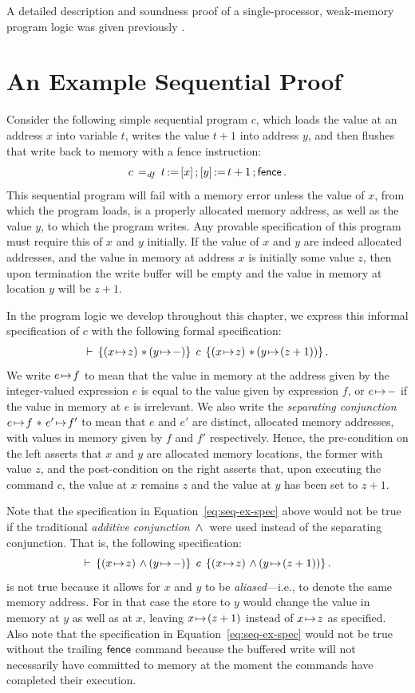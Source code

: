 \documentclass[11pt]{report}         %
\begin{document}
A detailed description and soundness proof of a single-processor, weak-memory program logic was given previously \cite{wmsldetails}. 

\section{An Example Sequential Proof}
\label{sec:ex-seq-proof}

Consider the following simple sequential program $c$, which loads the value at an address $x$ into variable $t$, writes the value $t+1$ into address $y$, and then flushes that write back to memory with a fence instruction: \[ c \operatorname{\;=_{\mathit{df}}\;} t \operatorname{:\!=} \left[ x \right] \operatorname{;} \left[ y \right] \operatorname{:\!=} t+1 \operatorname{;} \operatorname{\mathsf{fence}}.\] This sequential program will fail with a memory error unless the value of $x$, from which the program loads, is a properly allocated memory address, as well as the value $y$, to which the program writes. Any provable specification of this program must require this of $x$ and $y$ initially. If the value of $x$ and $y$ are indeed allocated addresses, and the value in memory at address $x$ is initially some value $z$, then upon termination the write buffer will be empty and the value in memory at location $y$ will be $z+1$. 

In the program logic we develop throughout this chapter, we express this informal specification of $c$ with the following formal specification: \begin{align}\label{eq:seq-ex-spec} \triple{(x \fpointsto z) \fsep (y \fpointsto -)}{c}{(x \fpointsto z) \fsep (y \fpointsto (z + 1))}.\end{align}
We write $e \!\mapsto\! f$ to mean that the value in memory at the address given by the integer-valued expression $e$ is equal to the value given by expression $f$, or $e \!\mapsto\! -$ if the value in memory at $e$ is irrelevant. We also write the \emph{separating conjunction} $e \!\mapsto\! f \operatorname{\,\ast\,} e' \!\mapsto\! f'$ to mean that $e$ and $e'$ are distinct, allocated memory addresses, with values in memory given by $f$ and $f'$ respectively. Hence, the pre-condition on the left asserts that $x$ and $y$ are allocated memory locations, the former with value $z$, and the post-condition on the right asserts that, upon executing the command $c$, the value at $x$ remains $z$ and the value at $y$ has been set to $z+1$. 

Note that the specification in Equation~\ref{eq:seq-ex-spec} above would not be true if the traditional \emph{additive conjunction} $\operatorname{\,\wedge\,}$ were used instead of the separating conjunction. That is, the following specification: \[ \triple{(x \fpointsto z) \conj (y \fpointsto -)}{c}{(x \fpointsto z) \conj (y \fpointsto (z + 1))}.\] is not true because it allows for $x$ and $y$ to be \emph{aliased}---i.e., to denote the same memory address. For in that case the store to $y$ would change the value in memory at $y$ as well as at $x$, leaving $x \!\mapsto\! (z+1)$ instead of $x \!\mapsto\! z$ as specified. Also note that the specification in Equation~\ref{eq:seq-ex-spec} would not be true without the trailing $\operatorname{\mathsf{fence}}$ command because the buffered write will not necessarily have committed to memory at the moment the commands have completed their execution. 
\end{document}
